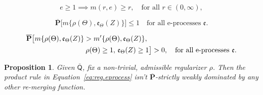 \documentclass[10pt,a4paper]{amsart}
\newtheorem{prop}{Proposition}
\newcommand{\eval}{\mathfrak{e}}
\newcommand{\uprior}{\overline{\mathsf{Q}}}
\newcommand{\uuprob}{\mathbf{\overline{P}}}
\begin{document}
\begin{equation}
\label{eq:sovereign}
e \geq 1 \implies m(r, e) \geq r, \quad \text{for all $r \in (0,\infty)$}, 
\end{equation}

\begin{equation}
\label{eq:merging}
\uuprob\bigl[ m\{ \rho(\Theta), \eval_{\Theta}(Z) \} \bigr] \leq 1 \quad \text{for all e-processes $\eval$}. 
\end{equation}

\begin{align}
\uuprob \bigl[ m\{ \rho(\Theta), \eval_\Theta(Z) \} > m'\{ \rho(\Theta), \eval_\Theta(Z) \}, \; & \notag \\
\rho(\Theta) \geq 1, \, \eval_\Theta(Z) \geq 1 & \bigr] > 0, \quad \text{for all e-processes $\eval$}. \label{eq:uuprob.dominance}
\end{align}

\begin{prop}
\label{prop:dominates}
Given $\uprior$, fix a non-trivial, admissible regularizer $\rho$.  Then the product rule in Equation~\eqref{eq:reg.eprocess} isn't $\uuprob$-strictly weakly dominated by any other re-merging function. 
\end{prop}
\end{document}
